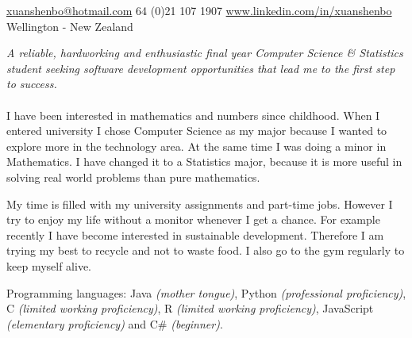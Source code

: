 \documentclass[10pt,a4paper]{article}
\begin{document}
\sloppy  %



\nobreakvspace{0.3em}  %

\noindent\href{mailto:xuanshenbo@hotmail.com}{xuanshenbo\mbox{}@\mbox{}hotmail.com}\sbull
\textsmaller{+}64 (0)21 107 1907\sbull
\href{http://www.linkedin.com/in/xuanshenbo}{www.linkedin.com/in/xuanshenbo}
\\
Wellington - New Zealand

\spacedhrule{0.9em}{-0.4em}  %


\vspace{-1.3em}  %
\begin{multicols}{2}  %
\noindent \emph{A reliable, hardworking and enthusiastic final year Computer Science \& Statistics student seeking software development opportunities that lead me to the first step to success.}
\\
\\

I have been interested in mathematics and numbers since childhood. When I entered university I chose Computer Science as my major because I wanted to explore more in the technology area. At the same time I 
was doing a minor in Mathematics. I have changed it to a Statistics major, because it is more useful in solving real world problems than pure mathematics.

My time is filled with my university assignments and part-time jobs. However I try to enjoy my life without a monitor whenever 
I get a chance. For example recently I have become interested in sustainable development. Therefore I am trying my best to 
recycle and not to waste food. I also go to the gym regularly to keep myself alive.

\end{multicols}



\spacedhrule{0.5em}{-0.4em}



\inlineheadsection
  {Programming languages:}
  {Java \emph{(mother tongue)}, Python \emph{(professional proficiency)}, C \emph{(limited working proficiency)}, R \emph{(limited working proficiency)}, JavaScript \emph{(elementary proficiency)} and C\# \emph{(beginner)}.}
\end{document}
